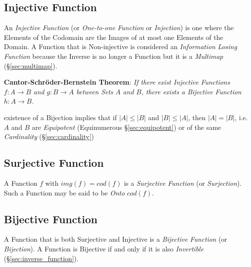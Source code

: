 \subsection{Injective Function}\label{sec:injective_function}

An \emph{Injective Function} (or \emph{One-to-one Function} or \emph{Injection})
is one where the Elements of the Codomain are the Images of at most one Elements
of the Domain. A Function that is Non-injective is considered an
\emph{Information Losing Function} because the Inverse is no longer a Function
but it is a \emph{Multimap} (\S\ref{sec:multimap}).

\textbf{Cantor-Schr\"oder-Bernstein Theorem}: \emph{If there exist Injective
  Functions $f : A \rightarrow B$ and $g : B \rightarrow A$ between Sets $A$ and
  $B$, there exists a Bijective Function $h : A \rightarrow B$.}

existence of a Bijection implies that if $|A| \leq |B|$ and $|B| \leq |A|$, then
$|A| = |B|$, i.e. $A$ and $B$ are \emph{Equipotent} (Equinumerous
\S\ref{sec:equipotent}) or of the same \emph{Cardinality}
(\S\ref{sec:cardinality})



\subsection{Surjective Function}\label{sec:surjective_function}

A Function $f$ with $img(f) = cod(f)$ is a \emph{Surjective Function}
(or \emph{Surjection}). Such a Function may be said to be \emph{Onto}
$cod(f)$.



\subsection{Bijective Function}\label{sec:bijective_function}

A Function that is both Surjective and Injective is a \emph{Bijective
  Function} (or \emph{Bijection}). A Function is Bijective if and only
if it is also \emph{Invertible} (\S\ref{sec:inverse_function}).


